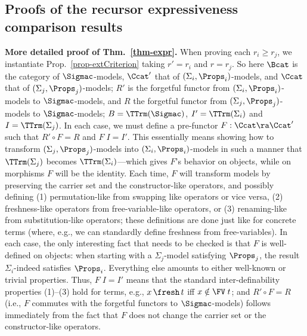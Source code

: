 \subsection{Proofs of the recursor expressiveness comparison results}
\label{app-subsec-proofsofOthers}



\noindent %
\textbf{More detailed proof of Thm.~\ref{thm-expr}.}   
%
	When proving each 
	$r_i \geq r_j$, we instantiate Prop.~\ref{prop-extCriterion} %
	taking $r' = r_i$ and $r = r_j$. So here $\Bcat$ is the category of $\Sigmac$-models, $\Ccat'$ that of $(\Sigma_i,\Props_i)$-models, 
	and $\Ccat$ that of $(\Sigma_j,\Props_j)$-models; $R'$ 
	is the forgetful functor from $(\Sigma_i,\Props_i)$-models to $\Sigmac$-models, and $R$ the forgetful functor from $(\Sigma_j,\Props_j)$-models to $\Sigmac$-models; 
	$B=\TTrm(\Sigmac)$, 
	$I'=\TTrm(\Sigma_i)$ and $I=\TTrm(\Sigma_j)$.  
	In each case, we must define a pre-functor $F : \Ccat \ra \Ccat'$  
	such that 
	$R' \circ F = R$ and $F\;I = I'$.  
	This essentially means showing how to %
	transform $(\Sigma_j,\Props_j)$-models into $(\Sigma_i,\Props_i)$-models in such a manner that $\TTrm(\Sigma_j)$ 
	becomes $\TTrm(\Sigma_i)$---which gives $F$'s behavior on objects, while on morphisms $F$ will be the identity. Each time, $F$ will transform models by preserving the carrier set and the constructor-like operators, and possibly defining 
	(1) permutation-like from swapping like operators or vice versa, (2) 
	freshness-like operators from 
	free-variable-like operators, or (3) renaming-like from substitution-like operators; 
	these definitions are done just like for concrete terms (where, e.g., we can standardly define freshness from free-variables). In each case, the only interesting fact that needs to be checked is that $F$ is well-defined on objects: when starting with a $\Sigma_j$-model satisfying $\Props_j$, the result $\Sigma_i$-indeed satisfies $\Props_i$. Everything else %
	amounts to either well-known or trivial properties. Thus, $F\;I = I'$ means that the standard inter-definability properties (1)--(3) hold for terms, e.g., $x \,\fresh\, t$ iff $x \notin \FV\;t$; and $R' \circ F = R$ (i.e., $F$ commutes with the forgetful functors to $\Sigmac$-models) follows immediately from the fact that $F$ does not change the carrier set or the constructor-like operators. 
	
